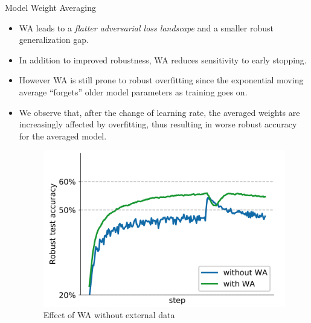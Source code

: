 \begin{frame}{Model Weight Averaging}
    \begin{itemize}
        \item WA leads to a \emph{flatter adversarial loss landscape} and a smaller robust generalization gap.
        \item In addition to improved robustness, WA reduces sensitivity to early stopping. 
        \item However WA is still prone to robust overfitting since the exponential moving average “forgets” older model parameters as training goes on.
        \item We observe that, after the change of learning rate, the averaged weights are increasingly affected by overfitting, thus resulting in worse robust accuracy for the averaged model.
        \begin{figure}
            \centering
            \includegraphics[height=.4\textheight]{pic/weight_averaging.png}
            \caption{Effect of WA without external data}
            \centering
            \label{fig:weight_averaging}
        \end{figure}
    \end{itemize}
\end{frame}

